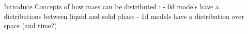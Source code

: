 Introduce Concepts of how mass can be distributed : 
- 0d models have a distributions between liquid and solid phase
- 1d models have a distribution over space (and time?)
